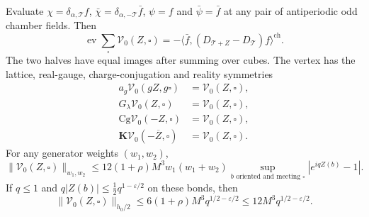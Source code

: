 \begin{proposition}\label{prop:rg-step-first-vertex}
Evaluate $\chi=\delta_{\alpha,\mathscr T}f$,
$\bar\chi=\delta_{\alpha,-\mathscr T}\bar f$,
$\psi=f$ and $\bar\psi=\bar f$ at any pair of
antiperiodic odd chamber fields. Then
\begin{equation}\label{eq:rg-step-first-vertex-evaluation}
 \operatorname{ev}\sum_\square\mathcal V_0(Z,\square)
          =-\langle\bar f,(D_{\mathscr T+Z}-D_{\mathscr T})
                                                    f\rangle^{\mathrm{ch}}.
\end{equation}
The two halves have equal images after summing
over cubes. The vertex has the lattice, real-gauge,
charge-conjugation and reality symmetries
\begin{equation}\label{eq:rg-step-first-vertex-symmetries}
 \begin{split}
 a_g\mathcal V_0(gZ,g\square)&=\mathcal V_0(Z,\square),\\
 G_\lambda\mathcal V_0(Z,\square)&=\mathcal V_0(Z,\square),\\
 \mathrm{Cg}\mathcal V_0(-Z,\square)&=\mathcal V_0(Z,\square),\\
 \mathbf K\mathcal V_0(-\overline Z,\square)&=\mathcal V_0(Z,\square).
 \end{split}
\end{equation}
For any generator weights $(w_1,w_2)$,
\begin{equation}\label{eq:rg-step-first-vertex-bound}
 \|\mathcal V_0(Z,\square)\|_{w_1,w_2}
       \le12(1+\rho)M^3w_1(w_1+w_2)
       \sup_{b\text{ oriented and meeting }\square}
                                                      |e^{iqZ(b)}-1|.
\end{equation}
If $q\le1$ and
$q|Z(b)|\le\frac12q^{1-\varepsilon/2}$ on these bonds,
then
\begin{equation}\label{eq:rg-step-first-vertex-small-bound}
 \|\mathcal V_0(Z,\square)\|_{h_0/2}
                 \le6(1+\rho)M^3q^{1/2-\varepsilon/2}
                 \le12M^3q^{1/2-\varepsilon/2}.
\end{equation}
\end{proposition}

